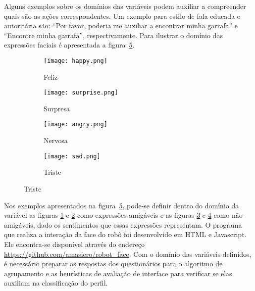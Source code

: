 Alguns exemplos sobre os domínios das variáveis podem auxiliar a compreender quais são as ações correspondentes. Um exemplo para estilo de fala educada e autoritária são: ``Por favor, poderia me auxiliar a encontrar minha garrafa'' e ``Encontre minha garrafa'', respectivamente. Para ilustrar o domínio das expressões faciais é apresentada a figura~\ref{fig:dominioexpressoesfaciais}.

\begin{figure}[ht!]
	\centering
	\begin{minipage}{\textwidth}
		\caption{Visão geral do processo de construção do classificador.}
		\begin{subfigure}[b]{0.48\textwidth}
			\texttt{[image: happy.png]}
	        \caption{Feliz}
	        \label{fig:feliz}
	    \end{subfigure}
	    \hfill
		\begin{subfigure}[b]{0.48\textwidth}
	        \texttt{[image: surprise.png]}
	        \caption{Surpresa}
	        \label{fig:surpresa}
	    \end{subfigure}

		\begin{subfigure}[b]{0.48\textwidth}
	        \texttt{[image: angry.png]}
	        \caption{Nervosa}
	        \label{fig:nervosa}
    	\end{subfigure}
		\hfill
		\begin{subfigure}[b]{0.48\textwidth}
	        \texttt{[image: sad.png]}
	        \caption{Triste}
	        \label{fig:triste}
    	\end{subfigure}
		\label{fig:dominioexpressoesfaciais}
	\end{minipage}
\end{figure}

Nos exemplos apresentados na figura~\ref{fig:dominioexpressoesfaciais}, pode-se definir dentro do domínio da variável as figuras \ref{fig:feliz} e \ref{fig:surpresa} como expressões amigáveis e as figuras \ref{fig:nervosa} e \ref{fig:triste} como não amigáveis, dado os sentimentos que essas expressões representam. O programa que realiza a interação da face do robô foi desenvolvido em HTML e Javascript. Ele encontra-se disponível através do endereço \url{https://github.com/amasiero/robot_face}. Com o domínio das variáveis definidos, é necessário preparar as respostas dos questionários para o algoritmo de agrupamento e as heurísticas de avaliação de interface para verificar se elas auxiliam na classificação do perfil.

